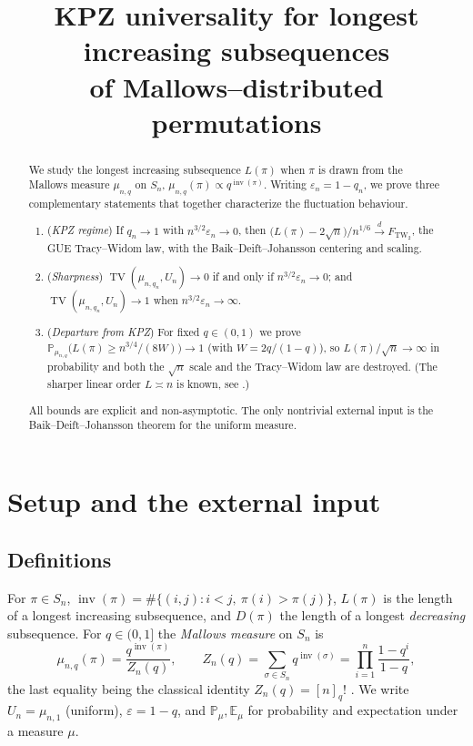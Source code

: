 \documentclass[12pt]{article}
\theoremstyle{definition}
\DeclareMathOperator{\inv}{inv}
\DeclareMathOperator{\TV}{TV}
\newcommand{\TW}{\mathrm{TW}_2}
\newcommand{\E}{\mathbb{E}}
\newcommand{\PP}{\mathbb{P}}
\newcommand{\eps}{\varepsilon}
\begin{document}
\title{KPZ universality for longest increasing subsequences \\ of Mallows--distributed permutations}
\author{}
\date{}
\maketitle

\begin{abstract}
We study the longest increasing subsequence $L(\pi)$ when $\pi$ is drawn from the
Mallows measure $\mu_{n,q}$ on $S_n$, $\mu_{n,q}(\pi)\propto q^{\inv(\pi)}$. Writing
$\eps_n=1-q_n$, we prove three complementary statements that together characterize the
fluctuation behaviour.
\begin{enumerate}
\item[(A)] (\emph{KPZ regime}) If $q_n\to1$ with $n^{3/2}\eps_n\to0$, then
$\big(L(\pi)-2\sqrt n\big)/n^{1/6}\xrightarrow{d}F_{\TW}$, the GUE Tracy--Widom law,
with the Baik--Deift--Johansson centering and scaling.
\item[(B)] (\emph{Sharpness}) $\TV(\mu_{n,q_n},U_n)\to0$ if and only if
$n^{3/2}\eps_n\to0$; and $\TV(\mu_{n,q_n},U_n)\to1$ when $n^{3/2}\eps_n\to\infty$.
\item[(C)] (\emph{Departure from KPZ}) For fixed $q\in(0,1)$ we prove
$\PP_{\mu_{n,q}}\big(L(\pi)\ge n^{3/4}/(8W)\big)\to1$ (with $W=2q/(1-q)$), so
$L(\pi)/\sqrt n\to\infty$ in probability and both the $\sqrt n$ scale and the
Tracy--Widom law are destroyed. (The sharper linear order $L\asymp n$ is known, see
\cite{BP}.)
\end{enumerate}
All bounds are explicit and non-asymptotic. The only nontrivial external input is the
Baik--Deift--Johansson theorem for the uniform measure.
\end{abstract}

\section{Setup and the external input}\label{sec:setup}

\subsection{Definitions}
For $\pi\in S_n$, $\inv(\pi)=\#\{(i,j):i<j,\ \pi(i)>\pi(j)\}$, $L(\pi)$ is the length of
a longest increasing subsequence, and $D(\pi)$ the length of a longest \emph{decreasing}
subsequence. For $q\in(0,1]$ the \emph{Mallows measure} on $S_n$ is
\begin{equation}\label{eq:mallows}
\mu_{n,q}(\pi)=\frac{q^{\inv(\pi)}}{Z_n(q)},\qquad
Z_n(q)=\sum_{\sigma\in S_n}q^{\inv(\sigma)}=\prod_{i=1}^{n}\frac{1-q^{i}}{1-q},
\end{equation}
the last equality being the classical identity $Z_n(q)=[n]_q!$ \cite[\S1.3]{Stanley}.
We write $U_n=\mu_{n,1}$ (uniform), $\eps=1-q$, and $\PP_\mu,\E_\mu$ for probability and
expectation under a measure $\mu$.
\end{document}
